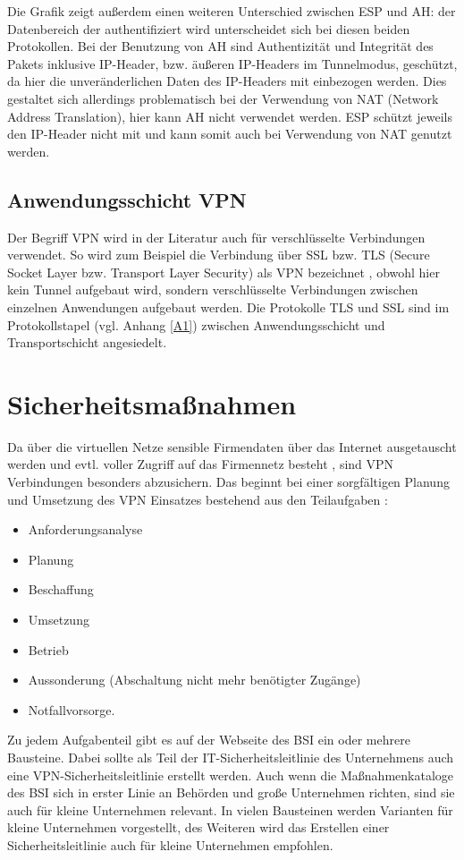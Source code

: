 Die Grafik zeigt außerdem einen weiteren Unterschied zwischen ESP und AH: der Datenbereich der authentifiziert wird unterscheidet sich bei diesen beiden Protokollen. Bei der Benutzung von AH sind Authentizität und Integrität des Pakets inklusive IP-Header, bzw. äußeren IP-Headers im Tunnelmodus,  geschützt, da hier die unveränderlichen Daten des IP-Headers mit einbezogen werden. Dies gestaltet sich allerdings problematisch bei der Verwendung von NAT (Network Address Translation), hier kann AH nicht verwendet werden. 
ESP schützt jeweils den IP-Header nicht mit und kann somit auch bei Verwendung von NAT genutzt werden. 

 
\subsection{Anwendungsschicht VPN}

Der Begriff VPN wird in der Literatur auch für verschlüsselte Verbindungen verwendet. So wird zum Beispiel die Verbindung über SSL bzw. TLS (Secure Socket Layer bzw. Transport Layer Security) als VPN bezeichnet \cite{isi-vpn} \cite{singh2012enhancing}, obwohl hier kein Tunnel aufgebaut wird, sondern verschlüsselte Verbindungen zwischen einzelnen Anwendungen aufgebaut werden. Die Protokolle TLS und SSL sind im Protokollstapel (vgl. Anhang \ref{A1}) zwischen Anwendungsschicht und Transportschicht angesiedelt. 

\section{Sicherheitsmaßnahmen}
Da über die virtuellen Netze sensible Firmendaten über das Internet ausgetauscht werden und evtl. voller Zugriff auf das Firmennetz besteht \cite{singh2012enhancing}, sind VPN Verbindungen besonders abzusichern. Das beginnt bei einer sorgfältigen Planung und Umsetzung des VPN Einsatzes bestehend aus den Teilaufgaben \cite{bsivpn}: 
\begin{itemize}
	\item Anforderungsanalyse
	\item Planung 
	\item Beschaffung
	\item Umsetzung 
	\item Betrieb
	\item Aussonderung (Abschaltung nicht mehr benötigter Zugänge)
	\item Notfallvorsorge.
\end{itemize} 
Zu jedem Aufgabenteil gibt es auf der Webseite des BSI ein oder mehrere Bausteine. 
Dabei sollte als Teil der IT-Sicherheitsleitlinie des Unternehmens auch eine VPN-Sicherheitsleitlinie erstellt werden. 
Auch wenn die Maßnahmenkataloge des BSI sich in erster Linie an Behörden und große Unternehmen richten, sind sie auch für kleine Unternehmen relevant. In vielen Bausteinen werden Varianten für kleine Unternehmen vorgestellt, des Weiteren wird das Erstellen einer Sicherheitsleitlinie auch für kleine Unternehmen empfohlen. 





